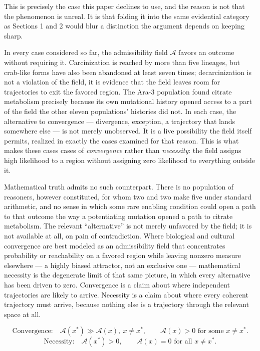 \documentclass[11pt]{article}
\theoremstyle{plain}
\begin{document}
This is precisely the case this paper declines to use, and the reason is not that the phenomenon is unreal. It is that folding it into the same evidential category as Sections 1 and 2 would blur a distinction the argument depends on keeping sharp.

In every case considered so far, the admissibility field \(\mathcal{A}\) favors an outcome without requiring it. Carcinization is reached by more than five lineages, but crab-like forms have also been abandoned at least seven times; decarcinization is not a violation of the field, it is evidence that the field leaves room for trajectories to exit the favored region. The Ara-3 population found citrate metabolism precisely because its own mutational history opened access to a part of the field the other eleven populations' histories did not. In each case, the alternative to convergence --- divergence, exception, a trajectory that lands somewhere else --- is not merely unobserved. It is a live possibility the field itself permits, realized in exactly the cases examined for that reason. This is what makes these cases cases of \emph{convergence} rather than \emph{necessity}: the field assigns high likelihood to a region without assigning zero likelihood to everything outside it.

Mathematical truth admits no such counterpart. There is no population of reasoners, however constituted, for whom two and two make five under standard arithmetic, and no sense in which some rare enabling condition could open a path to that outcome the way a potentiating mutation opened a path to citrate metabolism. The relevant ``alternative'' is not merely unfavored by the field; it is not available at all, on pain of contradiction. Where biological and cultural convergence are best modeled as an admissibility field that concentrates probability or reachability on a favored region while leaving nonzero measure elsewhere --- a highly biased attractor, not an exclusive one --- mathematical necessity is the degenerate limit of that same picture, in which every alternative has been driven to zero. Convergence is a claim about where independent trajectories are likely to arrive. Necessity is a claim about where every coherent trajectory must arrive, because nothing else is a trajectory through the relevant space at all.

\[
\text{Convergence:}\quad \mathcal{A}(x^\ast) \gg \mathcal{A}(x), \ x \neq x^\ast, \qquad \mathcal{A}(x) > 0 \text{ for some } x \neq x^\ast.
\]
\[
\text{Necessity:}\quad \mathcal{A}(x^\ast) > 0, \qquad \mathcal{A}(x) = 0 \text{ for all } x \neq x^\ast.
\]
\end{document}
